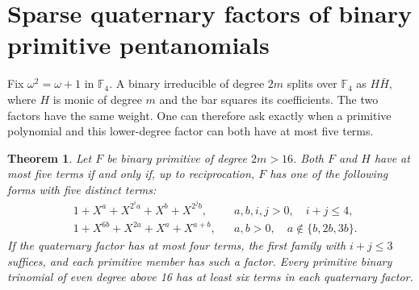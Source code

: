\documentclass[11pt]{article}
\newtheorem{theorem}{Theorem}
\begin{document}
\section{Sparse quaternary factors of binary primitive pentanomials}
\label{sec:sparse-quaternary-factors}
Fix \(\omega^2=\omega+1\) in \(\mathbb F_4\). A binary irreducible
of degree \(2m\) splits over \(\mathbb F_4\) as \(H\bar H\), where
\(H\) is monic of degree \(m\) and the bar squares its coefficients.
The two factors have the same weight. One can therefore ask exactly
when a primitive polynomial and this lower-degree factor can both
have at most five terms.

\begin{theorem}\label{thm:sparse-quaternary-factors}
Let \(F\) be binary primitive of degree \(2m>16\). Both \(F\) and
\(H\) have at most five terms if and only if, up to reciprocation,
\(F\) has one of the following forms with five distinct terms:
\begin{align*}
 &1+X^a+X^{2^i a}+X^b+X^{2^j b},
   && a,b,i,j>0,\quad i+j\le4,\\
 &1+X^{6b}+X^{2a}+X^a+X^{a+b},
   && a,b>0,\quad a\notin\{b,2b,3b\}.
\end{align*}
If the quaternary factor has at most four terms, the first family with
\(i+j\le3\) suffices, and each primitive member has such a factor.
Every primitive binary trinomial of even degree above 16 has at least
six terms in each quaternary factor.
\end{theorem}
\end{document}
